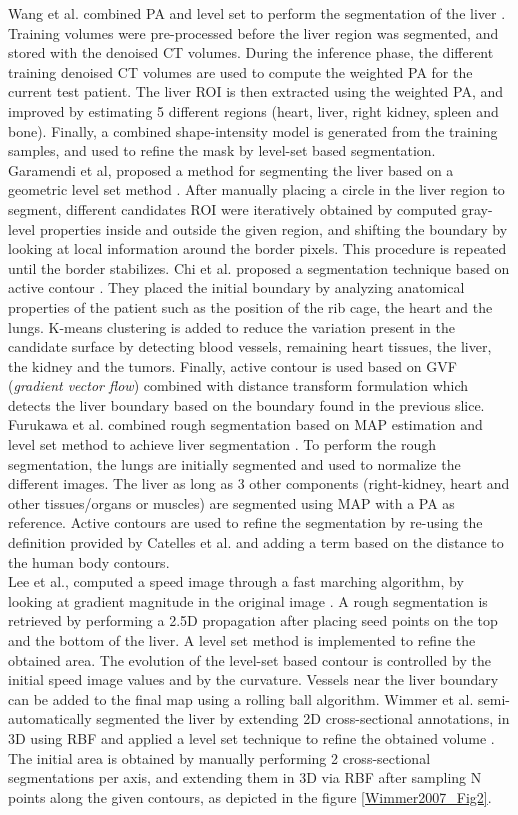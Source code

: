 \documentclass[]{article}
\begin{document}
Wang et al. combined PA and level set to perform the segmentation of the liver \cite{Wang2016}. Training volumes were pre-processed before the liver region was
segmented, and stored with the denoised CT volumes. During the inference
phase, the different training denoised CT volumes are used to compute
the weighted PA for the current test patient. The liver ROI is then
extracted using the weighted PA, and improved by estimating 5 different
regions (heart, liver, right kidney, spleen and bone). Finally, a
combined shape-intensity model is generated from the training samples,
and used to refine the mask by level-set based segmentation.\\
Garamendi et al, proposed a method for segmenting the liver based on a
geometric level set method \cite{Garamendi2007}. After manually placing a circle in the liver
region to segment, different candidates ROI were iteratively obtained by
computed gray-level properties inside and outside the given region, and
shifting the boundary by looking at local information around the border
pixels. This procedure is repeated until the border stabilizes.
Chi et al. proposed a segmentation technique based on active
contour \cite{Chi2007}. They placed the initial boundary by analyzing anatomical
properties of the patient such as the position of the rib cage, the
heart and the lungs. K-means clustering is added to reduce the variation
present in the candidate surface by detecting blood vessels, remaining
heart tissues, the liver, the kidney and the tumors. Finally, active
contour is used based on GVF (\emph{gradient vector flow}) combined with
distance transform formulation which detects the liver boundary based on
the boundary found in the previous slice.
Furukawa et al. combined rough segmentation based on MAP estimation and
level set method to achieve liver segmentation \cite{Furukawa2007}. To perform the rough
segmentation, the lungs are initially segmented and used to normalize
the different images. The liver as long as 3 other components
(right-kidney, heart and other tissues/organs or muscles) are segmented
using MAP with a PA as reference. Active contours are used to refine the
segmentation by re-using the definition provided by Catelles et al. and
adding a term based on the distance to the human body contours.\\ 
Lee et al., computed a speed image through a fast marching algorithm, by
looking at gradient magnitude in the original image \cite{Lee2007}. A rough
segmentation is retrieved by performing a 2.5D propagation after placing
seed points on the top and the bottom of the liver. A level set method
is implemented to refine the obtained area. The evolution of the
level-set based contour is controlled by the initial speed image values
and by the curvature. Vessels near the liver boundary can be added to
the final map using a rolling ball algorithm.
Wimmer et al. semi-automatically segmented the liver by extending 2D
cross-sectional annotations, in 3D using RBF and applied a level set
technique to refine the obtained volume \cite{Wimmer2007}. The initial area is obtained by
manually performing 2 cross-sectional segmentations per axis, and
extending them in 3D via RBF after sampling N points along the given
contours, as depicted in the figure \ref{Wimmer2007_Fig2}.
\end{document}

